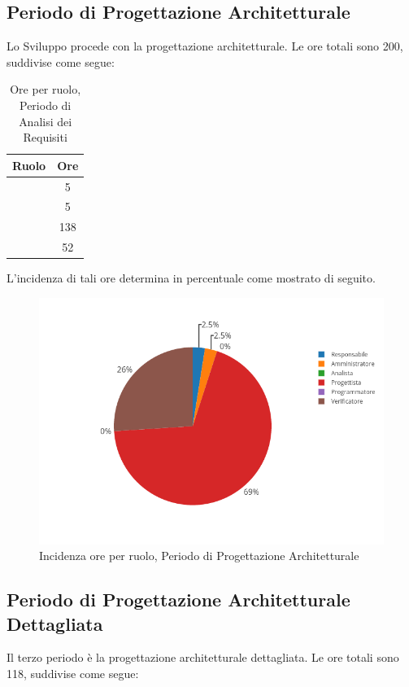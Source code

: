 \subsection{Periodo di Progettazione Architetturale}
Lo Sviluppo procede con la progettazione architetturale. Le ore totali sono 200, suddivise come segue:

\begin{table}[H]
	\begin{center}
		\begin{tabular}{|c|c|}
			\hline
			\textbf{Ruolo}	& \textbf{Ore} \\
			\hline
			\Res	&	5	\\
			\hline
			\Amm	&	5	\\
			\hline
			\Prog   &	138	\\
			\hline
			\Ver	&	52	\\
			\hline
		\end{tabular}
	\end{center}
	\caption{Ore per ruolo, Periodo di Analisi dei Requisiti}
\end{table}

L'incidenza di tali ore determina in percentuale come mostrato di seguito.
\begin{figure}[H]
	\centering
	\includegraphics[scale=0.6]{img/ProgettazioneArchitetturale.png}
	\caption{Incidenza ore per ruolo, Periodo di Progettazione Architetturale}
\end{figure}

\subsection{Periodo di Progettazione Architetturale Dettagliata}
Il terzo periodo è la progettazione architetturale dettagliata. Le ore totali sono 118, suddivise come segue:

